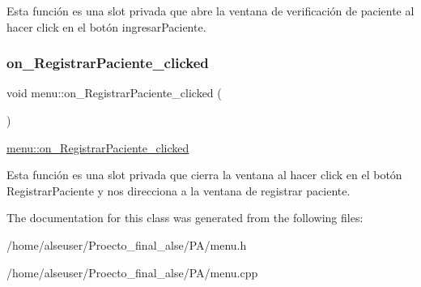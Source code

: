 Esta función es una slot privada que abre la ventana de verificación de paciente al hacer click en el botón ingresar\+Paciente. \mbox{\label{classmenu_a4b63e5a7f04e55d65315f93980ba8a43}} 
\subsubsection{\texorpdfstring{on\+\_\+\+Registrar\+Paciente\+\_\+clicked}{on\_RegistrarPaciente\_clicked}}
{\footnotesize\ttfamily void menu\+::on\+\_\+\+Registrar\+Paciente\+\_\+clicked (\begin{DoxyParamCaption}{ }\end{DoxyParamCaption})\hspace{0.3cm}{\ttfamily [slot]}}



\hyperlink{classmenu_a4b63e5a7f04e55d65315f93980ba8a43}{menu\+::on\+\_\+\+Registrar\+Paciente\+\_\+clicked} 

Esta función es una slot privada que cierra la ventana al hacer click en el botón Registrar\+Paciente y nos direcciona a la ventana de registrar paciente. 

The documentation for this class was generated from the following files\+:\begin{DoxyCompactItemize}
\item 
/home/alseuser/\+Proecto\+\_\+final\+\_\+alse/\+P\+A/menu.\+h\item 
/home/alseuser/\+Proecto\+\_\+final\+\_\+alse/\+P\+A/menu.\+cpp\end{DoxyCompactItemize}
